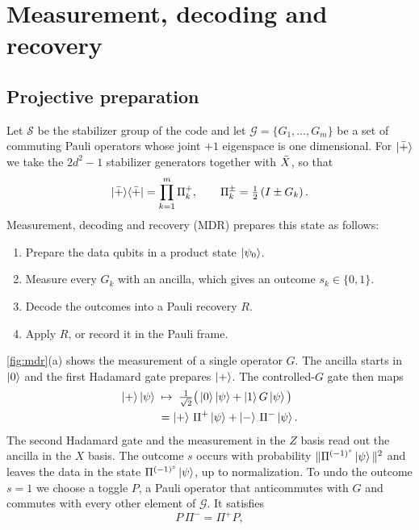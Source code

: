\section{Measurement, decoding and recovery}
\label{sec:mdr}

\subsection{Projective preparation}
\label{sec:mdr_basic}

Let $\mathcal{S}$ be the stabilizer group of the code and let $\mathcal{G}=\{G_1,\dots,G_m\}$ be a set of commuting Pauli operators whose joint $+1$ eigenspace is one dimensional. For $\left|\bar{+}\right\rangle$ we take the $2d^2-1$ stabilizer generators together with $\bar{X}$, so that
\begin{equation}
  \left|\bar{+}\right\rangle\!\left\langle\bar{+}\right|=\prod_{k=1}^{m}\Pi_k^{+},\qquad \Pi_k^{\pm}=\tfrac{1}{2}\left(I\pm G_k\right).
  \label{eq:target}
\end{equation}
Measurement, decoding and recovery (MDR) prepares this state as follows:
\begin{enumerate}
  \item Prepare the data qubits in a product state $\left|\psi_0\right\rangle$.
  \item Measure every $G_k$ with an ancilla, which gives an outcome $s_k\in\{0,1\}$.
  \item Decode the outcomes into a Pauli recovery $R$.
  \item Apply $R$, or record it in the Pauli frame.
\end{enumerate}
\autoref{fig:mdr}(a) shows the measurement of a single operator $G$. The ancilla starts in $\left|0\right\rangle$ and the first Hadamard gate prepares $\left|+\right\rangle$. The controlled-$G$ gate then maps
\begin{align}
  \left|+\right\rangle\left|\psi\right\rangle\;&\mapsto\;\tfrac{1}{\sqrt{2}}\big(\left|0\right\rangle\left|\psi\right\rangle+\left|1\right\rangle G\left|\psi\right\rangle\big)\nonumber\\
  &=\left|+\right\rangle\,\Pi^{+}\left|\psi\right\rangle+\left|-\right\rangle\,\Pi^{-}\left|\psi\right\rangle.
  \label{eq:projection}
\end{align}
The second Hadamard gate and the measurement in the $Z$ basis read out the ancilla in the $X$ basis. The outcome $s$ occurs with probability $\|\Pi^{(-1)^s}\left|\psi\right\rangle\|^2$ and leaves the data in the state $\Pi^{(-1)^s}\left|\psi\right\rangle$, up to normalization. To undo the outcome $s=1$ we choose a toggle $P$, a Pauli operator that anticommutes with $G$ and commutes with every other element of $\mathcal{G}$. It satisfies
\begin{equation}
  P\,\Pi^{-}=\Pi^{+}P,
  \label{eq:toggle}
\end{equation}
